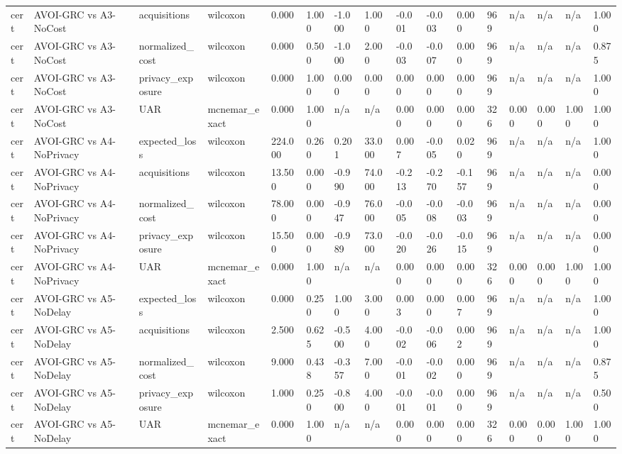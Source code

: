 \begin{table}[!ht]
{\begin{tabular}{llllllllllllllll}
cert & AVOI-GRC vs A3-NoCost & acquisitions & wilcoxon & 0.000 & 1.000 & -1.000 & 1.000 & -0.001 & -0.003 & 0.000 & 969 & n/a & n/a & n/a & 1.000 \\
cert & AVOI-GRC vs A3-NoCost & normalized\_cost & wilcoxon & 0.000 & 0.500 & -1.000 & 2.000 & -0.003 & -0.007 & 0.000 & 969 & n/a & n/a & n/a & 0.875 \\
cert & AVOI-GRC vs A3-NoCost & privacy\_exposure & wilcoxon & 0.000 & 1.000 & 0.000 & 0.000 & 0.000 & 0.000 & 0.000 & 969 & n/a & n/a & n/a & 1.000 \\
cert & AVOI-GRC vs A3-NoCost & UAR & mcnemar\_exact & 0.000 & 1.000 & n/a & n/a & 0.000 & 0.000 & 0.000 & 326 & 0.000 & 0.000 & 1.000 & 1.000 \\
cert & AVOI-GRC vs A4-NoPrivacy & expected\_loss & wilcoxon & 224.000 & 0.260 & 0.201 & 33.000 & 0.007 & -0.005 & 0.020 & 969 & n/a & n/a & n/a & 1.000 \\
cert & AVOI-GRC vs A4-NoPrivacy & acquisitions & wilcoxon & 13.500 & 0.000 & -0.990 & 74.000 & -0.213 & -0.270 & -0.157 & 969 & n/a & n/a & n/a & 0.000 \\
cert & AVOI-GRC vs A4-NoPrivacy & normalized\_cost & wilcoxon & 78.000 & 0.000 & -0.947 & 76.000 & -0.005 & -0.008 & -0.003 & 969 & n/a & n/a & n/a & 0.000 \\
cert & AVOI-GRC vs A4-NoPrivacy & privacy\_exposure & wilcoxon & 15.500 & 0.000 & -0.989 & 73.000 & -0.020 & -0.026 & -0.015 & 969 & n/a & n/a & n/a & 0.000 \\
cert & AVOI-GRC vs A4-NoPrivacy & UAR & mcnemar\_exact & 0.000 & 1.000 & n/a & n/a & 0.000 & 0.000 & 0.000 & 326 & 0.000 & 0.000 & 1.000 & 1.000 \\
cert & AVOI-GRC vs A5-NoDelay & expected\_loss & wilcoxon & 0.000 & 0.250 & 1.000 & 3.000 & 0.003 & 0.000 & 0.007 & 969 & n/a & n/a & n/a & 1.000 \\
cert & AVOI-GRC vs A5-NoDelay & acquisitions & wilcoxon & 2.500 & 0.625 & -0.500 & 4.000 & -0.002 & -0.006 & 0.002 & 969 & n/a & n/a & n/a & 1.000 \\
cert & AVOI-GRC vs A5-NoDelay & normalized\_cost & wilcoxon & 9.000 & 0.438 & -0.357 & 7.000 & -0.001 & -0.002 & 0.000 & 969 & n/a & n/a & n/a & 0.875 \\
cert & AVOI-GRC vs A5-NoDelay & privacy\_exposure & wilcoxon & 1.000 & 0.250 & -0.800 & 4.000 & -0.001 & -0.001 & 0.000 & 969 & n/a & n/a & n/a & 0.500 \\
cert & AVOI-GRC vs A5-NoDelay & UAR & mcnemar\_exact & 0.000 & 1.000 & n/a & n/a & 0.000 & 0.000 & 0.000 & 326 & 0.000 & 0.000 & 1.000 & 1.000 \\

\end{tabular}}
\end{table}
